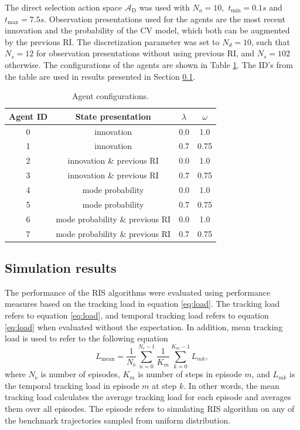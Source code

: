 \documentclass[english, 12pt, a4paper, elec, utf8, a-1b, online]{aaltothesis}
\newcommand{\Ne}{N_\text{e}}
\newcommand{\As}{\mathcal{A}}
\newcommand{\tmax}{t_\text{max}}
\newcommand{\tmin}{t_\text{min}}
\newcommand{\Asdir}{\As_\text{D}}
\begin{document}
The direct selection action space $\Asdir$ was used with $N_a=10,$ $\tmin=0.1s$ and $\tmax=7.5s$.
Observation presentations used for the agents are the most recent innovation and the probability of the CV model, which both can be augmented by the previous RI.
The discretization parameter was set to $N_d=10$, such that $N_s=12$ for observation presentations without using previous RI, and $N_s=102$ otherwise.
The configurations of the agents are shown in Table \ref{tab:agent_configurations}. The ID's from the table are used in results presented in Section \ref{sec:ri_sim}.

\begin{table}[t]
    \centering
    \begin{tabular}{|c | c | c |c |}
        \hline
        \textbf{Agent ID} & \textbf{State presentation}  & $\lambda$  &  $\omega$ \\
        \hline
        0 & innovation & 0.0 & 1.0 \\ \hline
        1 & innovation & 0.7 & 0.75 \\ \hline
        2 & innovation \& previous RI &  0.0 & 1.0 \\ \hline
        3 & innovation \& previous RI & 0.7 & 0.75 \\ \hline
        4 & mode probability &  0.0 & 1.0 \\ \hline
        5 & mode probability & 0.7 & 0.75 \\ \hline 
        6 & mode probability \& previous RI &  0.0 & 1.0 \\ \hline 
        7 & mode probability \& previous RI & 0.7 & 0.75 \\
        \hline
    \end{tabular}
    \caption{Agent configurations.}
    \label{tab:agent_configurations}
\end{table}


\subsection{Simulation results}\label{sec:ri_sim}

The performance of the RIS algorithms were evaluated using performance measures based on the tracking load in equation \eqref{eq:load}.
The tracking load refers to equation \eqref{eq:load}, and temporal tracking load refers to equation \eqref{eq:load} when evaluated without the expectation.
In addition, mean tracking load is used to refer to the following equation
\begin{equation}\label{eq:criterion_load}
    L_\text{mean} = \frac{1}{\Ne} \sum_{n=0}^{\Ne-1} \frac{1}{K_m}\sum_{k=0}^{K_m-1} L_{mk},
\end{equation}
where $\Ne$ is number of episodes, $K_m$ is number of steps in episode $m$, and $L_{mk}$ is the temporal tracking load in episode $m$ at step $k$.
In other words, the mean tracking load calculates the average tracking load for each episode and averages them over all episodes.  
The episode refers to simulating RIS algorithm on any of the benchmark trajectories sampled from uniform distribution.
\end{document}
